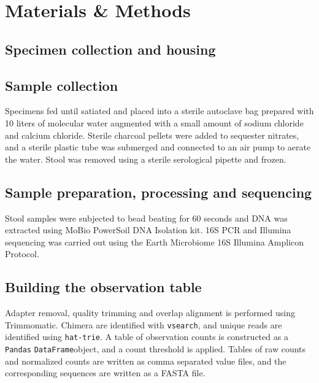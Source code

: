 \section{Materials \& Methods}

\subsection{Specimen collection and housing}







\subsection{Sample collection}

Specimens fed until satiated and placed into a sterile autoclave bag prepared with 10 liters of molecular water augmented with a small amount of sodium chloride and calcium chloride. Sterile charcoal pellets were added to sequester nitrates, and a sterile plastic tube was submerged and connected to an air pump to aerate the water. Stool was removed using a sterile serological pipette and frozen.

\subsection{Sample preparation, processing and sequencing}

Stool samples were subjected to bead beating for 60 seconds and DNA was extracted using MoBio PowerSoil DNA Isolation kit. 16S PCR and Illumina sequencing was carried out using the Earth Microbiome 16S Illumina Amplicon Protocol. 

\subsection{Building the observation table}

Adapter removal, quality trimming and overlap alignment is performed using Trimmomatic. Chimera are identified with {\tt vsearch}, and unique reads are identified using {\tt hat-trie}. A table of observation counts is constructed as a {\tt Pandas} {\tt DataFrame}object, and a count threshold is applied. Tables of raw counts and normalized counts are written as comma separated value files, and the corresponding sequences are written as a FASTA file.

